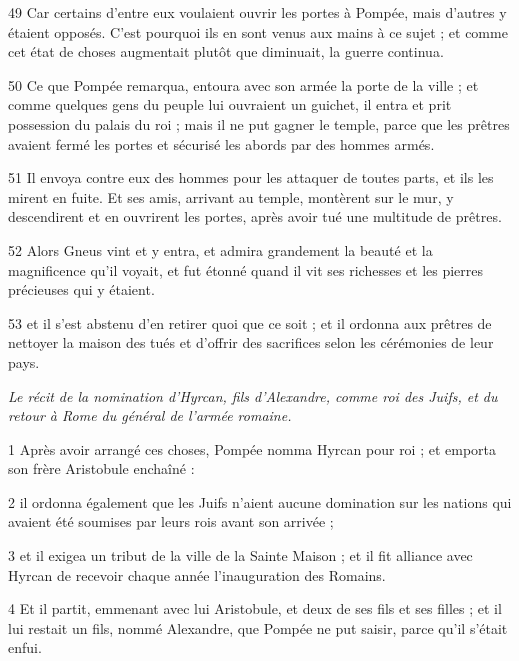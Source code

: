\par 49 Car certains d'entre eux voulaient ouvrir les portes à Pompée, mais d'autres y étaient opposés. C’est pourquoi ils en sont venus aux mains à ce sujet ; et comme cet état de choses augmentait plutôt que diminuait, la guerre continua.

\par 50 Ce que Pompée remarqua, entoura avec son armée la porte de la ville ; et comme quelques gens du peuple lui ouvraient un guichet, il entra et prit possession du palais du roi ; mais il ne put gagner le temple, parce que les prêtres avaient fermé les portes et sécurisé les abords par des hommes armés.

\par 51 Il envoya contre eux des hommes pour les attaquer de toutes parts, et ils les mirent en fuite. Et ses amis, arrivant au temple, montèrent sur le mur, y descendirent et en ouvrirent les portes, après avoir tué une multitude de prêtres.

\par 52 Alors Gneus vint et y entra, et admira grandement la beauté et la magnificence qu'il voyait, et fut étonné quand il vit ses richesses et les pierres précieuses qui y étaient.

\par 53 et il s'est abstenu d'en retirer quoi que ce soit ; et il ordonna aux prêtres de nettoyer la maison des tués et d'offrir des sacrifices selon les cérémonies de leur pays.


\par \textit{Le récit de la nomination d'Hyrcan, fils d'Alexandre, comme roi des Juifs, et du retour à Rome du général de l'armée romaine.}

\par 1 Après avoir arrangé ces choses, Pompée nomma Hyrcan pour roi ; et emporta son frère Aristobule enchaîné :

\par 2 il ordonna également que les Juifs n'aient aucune domination sur les nations qui avaient été soumises par leurs rois avant son arrivée ;

\par 3 et il exigea un tribut de la ville de la Sainte Maison ; et il fit alliance avec Hyrcan de recevoir chaque année l'inauguration des Romains.

\par 4 Et il partit, emmenant avec lui Aristobule, et deux de ses fils et ses filles ; et il lui restait un fils, nommé Alexandre, que Pompée ne put saisir, parce qu'il s'était enfui.

